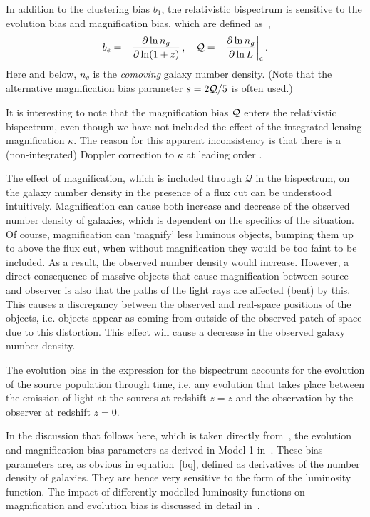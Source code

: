 In addition to the clustering bias  $b_1$, the relativistic bispectrum is sensitive to the evolution bias and magnification bias, which  are defined as~\cite{Alonso:2015uua},
\begin{equation} \label{bq}
b_e=  - \frac{\partial \ln n_g}{\partial\ln (1+z)}\,,~~~{ {\cal Q} =- \frac{\partial \ln n_g}{\partial\ln L}\bigg|_{\mathrm{c}}}\,.
\end{equation}
Here and below,  $n_{g}$ is the {\em comoving} galaxy number density.  (Note that the alternative magnification bias parameter  $s=2{\cal Q}/5$ is often used.)

{It is interesting to note that the magnification bias ${\cal Q}$ enters the relativistic bispectrum, even though we have not included the effect of the integrated lensing magnification $\kappa$. The reason for this apparent inconsistency is that there is a (non-integrated) Doppler correction to $\kappa$ at leading order \cite{Bonvin:2008ni,Bolejko:2012uj}.} 

The effect of magnification, which is included through $\mathcal{Q}$ in the bispectrum, on the galaxy number density in the presence of a flux cut can be understood intuitively. Magnification can cause both increase and decrease of the observed number density of galaxies, which is dependent on the specifics of the situation. Of course, magnification can `magnify' less luminous objects, bumping them up to above the flux cut, when without magnification they would be too faint to be included. As a result, the observed number density would increase. However, a direct consequence of massive objects that cause magnification between source and observer is also that the paths of the light rays are affected (bent) by this. This causes a discrepancy between the observed and real-space positions of the objects, i.e. objects appear as coming from outside of the observed patch of space due to this distortion. This effect will cause a decrease in the observed galaxy number density.

The evolution bias in the expression for the bispectrum accounts for the evolution of the source population through time, i.e. any evolution that takes place between the emission of light at the sources at redshift $z = z$ and the observation by the observer at redshift $z = 0$. 

In the discussion that follows here, which is taken directly from~\cite{Maartens:2019yhx}, the evolution and magnification bias parameters as derived in Model 1 in~\cite{Pozzetti:2016cch}. These bias parameters are, as obvious in equation~\eqref{bq}, defined as derivatives of the number density of galaxies. They are hence very sensitive to the form of the luminosity function. The impact of differently modelled luminosity functions on magnification and evolution bias is discussed in detail in~\cite{Maartens:2021dqy}. 

